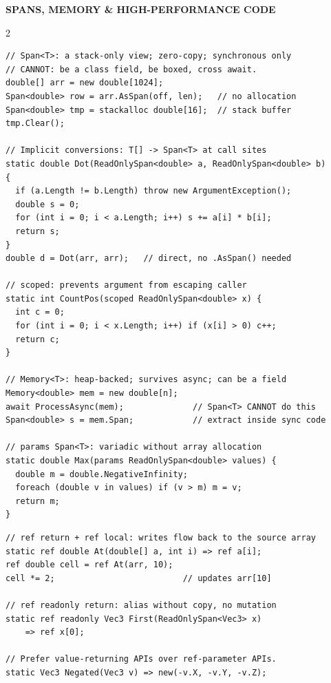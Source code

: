 \documentclass[9pt,a4paper]{extarticle}
\newenvironment{card}[3][acBlue]{%
  \begin{tcolorbox}[
    enhanced, colback=#2, colframe=bdCard,
    coltitle=black, colbacktitle=#2!70!bgHdr,
    fonttitle=\bfseries\fontsize{6.16pt}{7.48pt}\selectfont\MakeUppercase,
    title={#3},
    left=3pt, right=2pt, top=1.4pt, bottom=1.8pt,
    toptitle=1pt, bottomtitle=1pt,
    boxrule=0.4pt,
    borderline west={3pt}{0pt}{#1},
    arc=2pt, before skip=0pt, after skip=1.6mm,
    breakable, toprule at break=0pt, bottomrule at break=0pt,
  ]}{\end{tcolorbox}}
\newcommand{\sectionbanner}[1]{%
  \vspace{0.4mm}%
  {\setlength{\fboxsep}{1.5pt}%
   \colorbox{secBg}{\color{white}\bfseries\fontsize{6.6pt}{7.9pt}\selectfont
   \MakeUppercase{\hspace{0.5mm}#1\hspace{0.5mm}}}%
  }\vspace{1.3mm}\par\nobreak}
\begin{document}
\sectionbanner{Spans, Memory \& High-Performance Code}
\begin{multicols}{2}

\begin{card}[acAmber]{bgAmber}{Span, Memory \& stackalloc}
\begin{lstlisting}[style=cs]
// Span<T>: a stack-only view; zero-copy; synchronous only
// CANNOT: be a class field, be boxed, cross await.
double[] arr = new double[1024];
Span<double> row = arr.AsSpan(off, len);   // no allocation
Span<double> tmp = stackalloc double[16];  // stack buffer
tmp.Clear();

// Implicit conversions: T[] -> Span<T> at call sites
static double Dot(ReadOnlySpan<double> a, ReadOnlySpan<double> b)
{
  if (a.Length != b.Length) throw new ArgumentException();
  double s = 0;
  for (int i = 0; i < a.Length; i++) s += a[i] * b[i];
  return s;
}
double d = Dot(arr, arr);   // direct, no .AsSpan() needed

// scoped: prevents argument from escaping caller
static int CountPos(scoped ReadOnlySpan<double> x) {
  int c = 0;
  for (int i = 0; i < x.Length; i++) if (x[i] > 0) c++;
  return c;
}

// Memory<T>: heap-backed; survives async; can be a field
Memory<double> mem = new double[n];
await ProcessAsync(mem);              // Span<T> CANNOT do this
Span<double> s = mem.Span;            // extract inside sync code

// params Span<T>: variadic without array allocation
static double Max(params ReadOnlySpan<double> values) {
  double m = double.NegativeInfinity;
  foreach (double v in values) if (v > m) m = v;
  return m;
}
\end{lstlisting}
\end{card}

\begin{card}[acRed]{bgRed}{ref Returns \& ref Locals}
\begin{lstlisting}[style=cs]
// ref return + ref local: writes flow back to the source array
static ref double At(double[] a, int i) => ref a[i];
ref double cell = ref At(arr, 10);
cell *= 2;                          // updates arr[10]

// ref readonly return: alias without copy, no mutation
static ref readonly Vec3 First(ReadOnlySpan<Vec3> x)
    => ref x[0];

// Prefer value-returning APIs over ref-parameter APIs.
static Vec3 Negated(Vec3 v) => new(-v.X, -v.Y, -v.Z);


\end{lstlisting}
\end{card}
\end{multicols}
\end{document}
